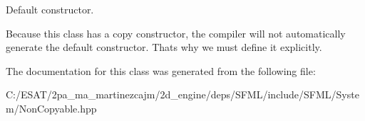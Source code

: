 Default constructor. 

Because this class has a copy constructor, the compiler will not automatically generate the default constructor. That\textquotesingle{}s why we must define it explicitly. 

The documentation for this class was generated from the following file\+:\begin{DoxyCompactItemize}
\item 
C\+:/\+E\+S\+A\+T/2pa\+\_\+ma\+\_\+martinezcajm/2d\+\_\+engine/deps/\+S\+F\+M\+L/include/\+S\+F\+M\+L/\+System/Non\+Copyable.\+hpp\end{DoxyCompactItemize}
